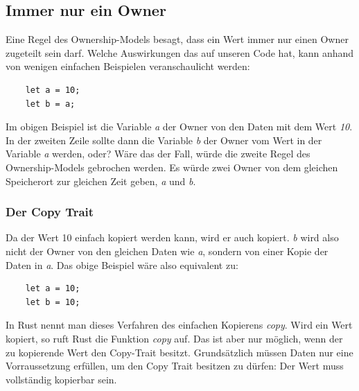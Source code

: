 \subsection{Immer nur ein Owner}
Eine Regel des Ownership-Models besagt, dass ein Wert immer nur einen Owner zugeteilt sein darf. Welche Auswirkungen das auf unseren Code hat, kann anhand
von wenigen einfachen Beispielen veranschaulicht werden:
\begin{lstlisting}
    let a = 10;
    let b = a;
\end{lstlisting}
Im obigen Beispiel ist die Variable \textit{a} der Owner von den Daten mit dem Wert \textit{10}. In der zweiten Zeile sollte dann die Variable \textit{b}
der Owner vom Wert in der Variable \textit{a} werden, oder? Wäre das der Fall, würde die zweite Regel des Ownership-Models gebrochen werden. Es würde zwei
Owner von dem gleichen Speicherort zur gleichen Zeit geben, \textit{a} und \textit{b}.

\subsubsection{Der Copy Trait}
Da der Wert 10 einfach kopiert werden kann, wird er auch kopiert. \textit{b} wird also nicht der Owner von den gleichen Daten wie \textit{a}, sondern
von einer Kopie der Daten in \textit{a}. Das obige Beispiel wäre also equivalent zu:
\begin{lstlisting}
    let a = 10;
    let b = 10;
\end{lstlisting}
In Rust nennt man dieses Verfahren des einfachen Kopierens \textit{copy}. Wird ein Wert kopiert, so ruft Rust die Funktion \textit{copy} auf. Das
ist aber nur möglich, wenn der zu kopierende Wert den Copy-Trait besitzt. Grundsätzlich müssen Daten nur eine Vorraussetzung erfüllen, um den
Copy Trait besitzen zu dürfen: Der Wert muss vollständig kopierbar sein.

